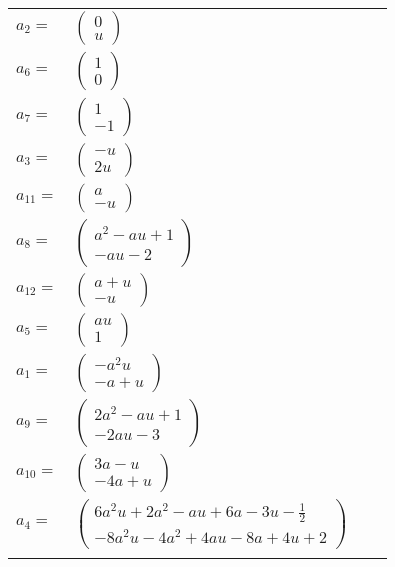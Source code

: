\documentclass[1p]{elsarticle_modified}
\theoremstyle{definition}
\begin{document}
\begin{tabular}{m{7pt} m{180pt} m{7pt} m{180pt} }
\flushright $a_{2}=$&$\begin{pmatrix}0\\u\end{pmatrix}$ \\
\flushright $a_{6}=$&$\begin{pmatrix}1\\0\end{pmatrix}$ \\
\flushright $a_{7}=$&$\begin{pmatrix}1\\-1\end{pmatrix}$ \\
\flushright $a_{3}=$&$\begin{pmatrix}- u\\2 u\end{pmatrix}$ \\
\flushright $a_{11}=$&$\begin{pmatrix}a\\- u\end{pmatrix}$ \\
\flushright $a_{8}=$&$\begin{pmatrix}a^2- a u+1\\- a u-2\end{pmatrix}$ \\
\flushright $a_{12}=$&$\begin{pmatrix}a+u\\- u\end{pmatrix}$ \\
\flushright $a_{5}=$&$\begin{pmatrix}a u\\1\end{pmatrix}$ \\
\flushright $a_{1}=$&$\begin{pmatrix}- a^2 u\\- a+u\end{pmatrix}$ \\
\flushright $a_{9}=$&$\begin{pmatrix}2 a^2- a u+1\\-2 a u-3\end{pmatrix}$ \\
\flushright $a_{10}=$&$\begin{pmatrix}3 a- u\\-4 a+u\end{pmatrix}$ \\
\flushright $a_{4}=$&$\begin{pmatrix}6 a^2 u+2 a^2- a u+6 a-3 u-\frac{1}{2}\\-8 a^2 u-4 a^2+4 a u-8 a+4 u+2\end{pmatrix}$\\&\end{tabular}
\end{document}

